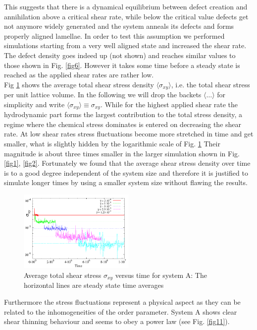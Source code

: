 \documentclass[8.5pt,twoside,twocolumn]{article}
\begin{document}
This suggests that there is a dynamical equilibrium between defect creation and annihilation above a critical shear rate, while below the critical value defects get not anymore widely generated and the system anneals its defects and forms properly aligned lamellae.
In order to test this assumption we performed simulations starting from a very well aligned state and increased the shear rate.
The defect density goes indeed up (not shown) and reaches similar values to those shown in Fig. \ref{fig6}.
However it takes some time before a steady state is reached as the applied shear rates are rather low.\\
Fig \ref{fig7} shows the average total shear stress density $\langle \sigma_{xy}\rangle$, i.e. the total shear stress per unit lattice volume.
In the following we will drop the backets $\langle\dots\rangle$ for simplicity and write $\langle \sigma_{xy}\rangle\equiv  \sigma_{xy}$.
While for the highest applied shear rate the hydrodynamic part forms the largest contribution to the total stress density, a regime where the chemical stress dominates is entered on decreasing the shear rate.
At low shear rates stress fluctuations become more stretched in time and get smaller, what is slightly hidden by the logarithmic scale of Fig. \ref{fig7}
Their magnitude is about three times smaller in the larger simulation shown in Fig. \ref{fig1}, \ref{fig2}.
Fortunately we found that the average shear stress density over time is to a good degree independent of the system size and therefore it is justified to simulate longer times by using a smaller system size without flawing the results.
\begin{figure}[!]
\centering
\includegraphics[angle=0,width=0.5\textwidth]{S_xy_tot_t_5e-4.pdf}
\caption{Average total shear stress $\sigma_{xy}$ versus time for system A: The horizontal lines are steady state time averages}
\label{fig7}
\end{figure}
Furthermore the stress fluctuations represent a physical aspect as they can be related to the inhomogeneities of the order parameter.
System A shows clear shear thinning behaviour and seems to obey a power law (see Fig. \ref{fig11}).
\end{document}
